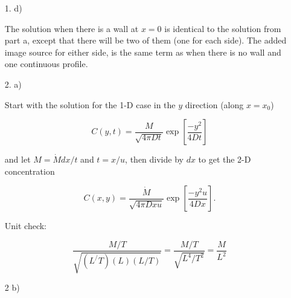 \documentclass[11pt]{article}
\begin{document}
\begin{enumerate}
\item[1. d)]

The solution when there is a wall at $x=0$ is identical to the solution from part a, except that there will be two of them (one for each side).  The added image source for either side, is the same term as when there is no wall and one continuous profile. 

\clearpage
\item[2. a)]  

Start with the solution for the 1-D case in the $y$ direction (along $x=x_0$)

$$C(y,t) = \frac{M}{\sqrt{4\pi Dt}}\exp\left[{\frac{-y^2}{4Dt}}\right]$$

and let $M=\dot{M}dx/t$ and $t=x/u$,  then divide by $dx$ to get the 2-D concentration

$$C(x,y) = \frac{\dot{M}}{\sqrt{4\pi Dxu}}\exp\left[{\frac{-y^2u}{4Dx}}\right].$$

Unit check:

$$\frac{M/T}{\sqrt{(L^/T)(L)(L/T)}}=\frac{M/T}{\sqrt{L^4/T^2}}=\frac{M}{L^2}$$

\item[2 b)]~


\end{enumerate}
\end{document}

